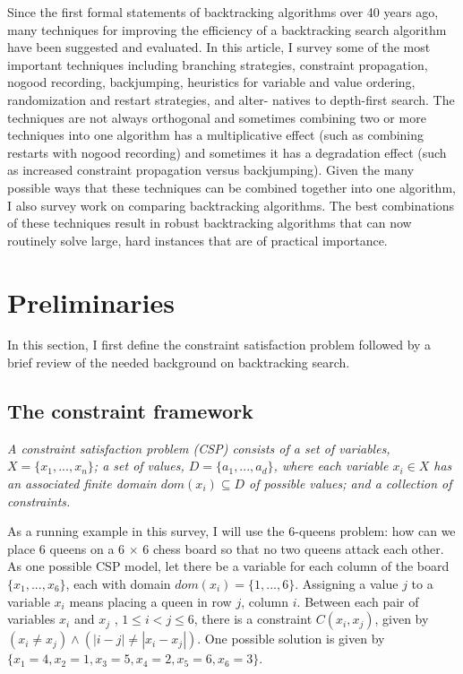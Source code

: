 \documentclass{article}
\begin{document}
Since the first formal statements of backtracking algorithms over 40 years ago,
many techniques for improving the efficiency of a backtracking search algorithm have been
suggested and evaluated. In this article, I survey some of the most important techniques
including branching strategies, constraint propagation, nogood recording, backjumping,
heuristics for variable and value ordering, randomization and restart strategies, and alter-
natives to depth-first search. The techniques are not always orthogonal and sometimes
combining two or more techniques into one algorithm has a multiplicative effect (such as
combining restarts with nogood recording) and sometimes it has a degradation effect (such
as increased constraint propagation versus backjumping). Given the many possible ways
that these techniques can be combined together into one algorithm, I also survey work on
comparing backtracking algorithms. The best combinations of these techniques result in
robust backtracking algorithms that can now routinely solve large, hard instances that are of practical importance.
\section{Preliminaries}
In this section, I first define the constraint satisfaction problem followed by a brief review
of the needed background on backtracking search.
\subsection{The constraint framework}
\begin{definition}[CSP] 
    \textit{A constraint satisfaction problem (CSP) consists of a set of variables,
    $X = \{ x_1, . . . , x_n\}$; a set of values, $D = \{a_1, . . . , a_d\}$, where each variable $x_i \in X$ has an associated finite domain $dom(x_i) \subseteq D$ of possible values; and a collection of constraints.}
\end{definition}
As a running example in this survey, I will use the 6-queens problem: how can we place
6 queens on a 6 $\times$ 6 chess board so that no two queens attack each other. As one possible
CSP model, let there be a variable for each column of the board $\{x_1, . . . , x_6\}$, each with
domain $dom(x_i) = \{1, . . . , 6\}$. Assigning a value $j$ to a variable $x_i$ means placing a queen in row $j$, column $i$. Between each pair of variables $x_i$ and $x_j$ , $1 \le i < j \le 6$, there is a constraint $C(x_i, x_j )$, given by $(x_i \neq x_j ) \wedge (|i - j| \neq |x_i - x_j |)$. One possible solution is given by $\{x_1 = 4, x_2 = 1, x_3 = 5, x_4 = 2, x_5 = 6, x_6 = 3\}$. 
\end{document}
